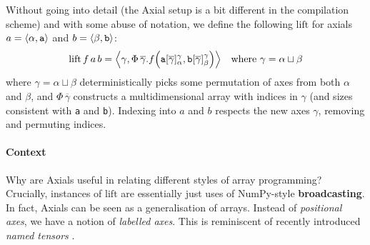Without going into detail (the Axial setup is a bit different in the compilation scheme) and with some abuse of notation, we define the following $\mathrm{lift}$ for axials $a = \phipair{\alpha}{\texttt{a}}$ and $b = \phipair{\beta}{\texttt{b}}$:
$$ 
\mathrm{lift}\,f\,a\,b = \phipair{\gamma}{\Phi\,\overline{\gamma}. 
f \left( \texttt{a}[\overline{\gamma}]_\alpha^\gamma, \texttt{b}[\overline{\gamma}]_\beta^\gamma \right) } \quad \text{where } \gamma = \alpha \sqcup \beta
$$
where $\gamma = \alpha \sqcup \beta$ deterministically picks some permutation of axes from both $\alpha$ and $\beta$, and $\Phi\,\overline{\gamma}$ constructs a multidimensional array with indices in $\gamma$ (and sizes consistent with \texttt{a} and \texttt{b}). 
Indexing into $a$ and $b$ respects the new axes $\gamma$, removing and permuting indices.



\paragraph{Context} Why are Axials useful in relating different styles of array programming? Crucially, instances of $\mathrm{lift}$ are essentially just uses of NumPy-style \textbf{broadcasting}.
In fact, Axials can be seen as a generalisation of arrays. 
Instead of \textit{positional axes}, we have a notion of \textit{labelled axes}. 
This is reminiscent of recently introduced  \textit{named tensors} \cite{chiang2022named}. 

